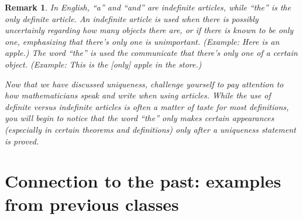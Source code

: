\documentclass{book}
\newcounter{ekcounter}%
\theoremstyle{ekimcustom}
\newtheorem{remark}[ekcounter]{Remark}
\begin{document}
\begin{remark}
In English, ``a'' and ``and'' are indefinite articles, while ``the'' is the only definite article. An indefinite article is used when there is possibly uncertainly regarding how many objects there are, or if there is known to be only one, emphasizing that there's only one is unimportant. (Example: Here is an apple.) The word ``the'' is used the communicate that there's only one of a certain object. (Example: This is the [only] apple in the store.)

Now that we have discussed uniqueness, challenge yourself to pay attention to how mathematicians speak and write when using articles. While the use of definite versus indefinite articles is often a matter of taste for most definitions, you will begin to notice that the word ``the'' only makes certain appearances (especially in certain theorems and definitions) only after a uniqueness statement is proved.
\end{remark}

\section{Connection to the past: examples from previous classes}\label{section:previous-class-proofs}
\end{document}
